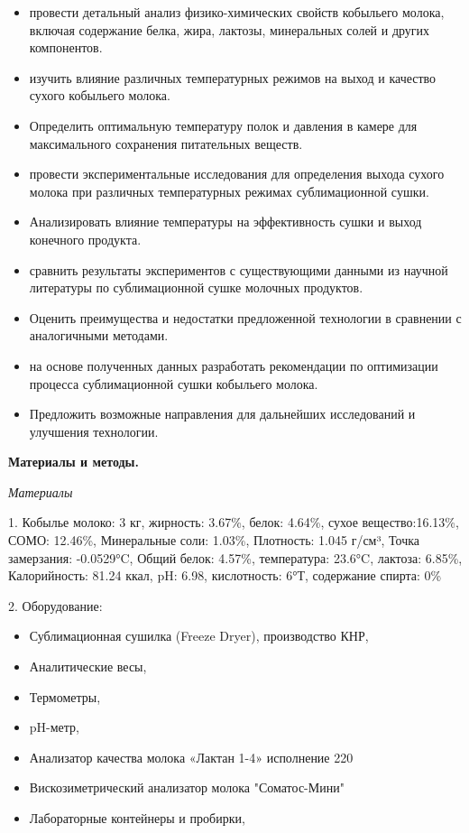 \begin{itemize}
\item
  провести детальный анализ физико-химических свойств кобыльего молока,
  включая содержание белка, жира, лактозы, минеральных солей и других
  компонентов.
\item
  изучить влияние различных температурных режимов на выход и качество
  сухого кобыльего молока.
\item
  Определить оптимальную температуру полок и давления в камере для
  максимального сохранения питательных веществ.
\item
  провести экспериментальные исследования для определения выхода сухого
  молока при различных температурных режимах сублимационной сушки.
\item
  Анализировать влияние температуры на эффективность сушки и выход
  конечного продукта.
\item
  сравнить результаты экспериментов с существующими данными из научной
  литературы по сублимационной сушке молочных продуктов.
\item
  Оценить преимущества и недостатки предложенной технологии в сравнении
  с аналогичными методами.
\item
  на основе полученных данных разработать рекомендации по оптимизации
  процесса сублимационной сушки кобыльего молока.
\item
  Предложить возможные направления для дальнейших исследований и
  улучшения технологии.
\end{itemize}

{\bfseries Материалы и методы.}

\emph{Материалы}

1. Кобылье молоко: 3 кг, жирность: 3.67\%, белок: 4.64\%, сухое
вещество:16.13\%, СОМО: 12.46\%, Минеральные соли: 1.03\%, Плотность:
1.045 г/см³, Точка замерзания: -0.0529°C, Общий белок: 4.57\%,
температура: 23.6°C, лактоза: 6.85\%, Калорийность: 81.24 ккал, pH:
6.98, кислотность: 6°Т, содержание спирта: 0\%

2. Оборудование:

\begin{itemize}
\item
  Сублимационная сушилка (Freeze Dryer), производство КНР,
\item
  Аналитические весы,
\item
  Термометры,
\item
  pH-метр,
\item
  Анализатор качества молока «Лактан 1-4» исполнение 220
\item
  Вискозиметрический анализатор молока "Соматос-Мини"
\item
  Лабораторные контейнеры и пробирки,
\end{itemize}

